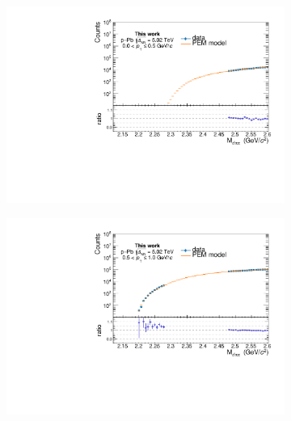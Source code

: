 \begin{appendices}
\begin{figure}[htb]
\begin{subfigure}{.5\textwidth}
  \centering
  \captionsetup{justification=centering}
  \includegraphics[width=\linewidth]{gfx/appendix/pem/can_blindPEM0}
  \caption{}
\end{subfigure}%
\begin{subfigure}{.5\textwidth}
  \centering
  \captionsetup{justification=centering}
  \includegraphics[width=\linewidth]{gfx/appendix/pem/can_blindPEM1}
  \caption{}
\end{subfigure}
\begin{subfigure}{.5\textwidth}
  \centering
  \captionsetup{justification=centering}

\end{subfigure}
\end{figure}
\end{appendices}

